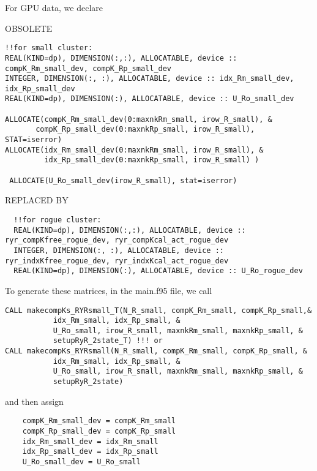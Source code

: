 For GPU data, we declare

OBSOLETE
\begin{verbatim}
!!for small cluster:
REAL(KIND=dp), DIMENSION(:,:), ALLOCATABLE, device :: compK_Rm_small_dev, compK_Rp_small_dev
INTEGER, DIMENSION(:, :), ALLOCATABLE, device :: idx_Rm_small_dev, idx_Rp_small_dev
REAL(KIND=dp), DIMENSION(:), ALLOCATABLE, device :: U_Ro_small_dev

ALLOCATE(compK_Rm_small_dev(0:maxnkRm_small, irow_R_small), &
       compK_Rp_small_dev(0:maxnkRp_small, irow_R_small), STAT=iserror)
ALLOCATE(idx_Rm_small_dev(0:maxnkRm_small, irow_R_small), &
         idx_Rp_small_dev(0:maxnkRp_small, irow_R_small) )
         
 ALLOCATE(U_Ro_small_dev(irow_R_small), stat=iserror)         
\end{verbatim}
REPLACED BY
\begin{verbatim}
  !!for rogue cluster:
  REAL(KIND=dp), DIMENSION(:,:), ALLOCATABLE, device :: ryr_compKfree_rogue_dev, ryr_compKcal_act_rogue_dev
  INTEGER, DIMENSION(:, :), ALLOCATABLE, device :: ryr_indxKfree_rogue_dev, ryr_indxKcal_act_rogue_dev
  REAL(KIND=dp), DIMENSION(:), ALLOCATABLE, device :: U_Ro_rogue_dev
\end{verbatim}


To generate these matrices, in the main.f95 file, we call
\begin{verbatim}
CALL makecompKs_RYRsmall_T(N_R_small, compK_Rm_small, compK_Rp_small,& 
           idx_Rm_small, idx_Rp_small, &
           U_Ro_small, irow_R_small, maxnkRm_small, maxnkRp_small, &
           setupRyR_2state_T) !!! or
CALL makecompKs_RYRsmall(N_R_small, compK_Rm_small, compK_Rp_small, &
           idx_Rm_small, idx_Rp_small, &
           U_Ro_small, irow_R_small, maxnkRm_small, maxnkRp_small, & 
           setupRyR_2state)
\end{verbatim}
and then assign
\begin{verbatim}
    compK_Rm_small_dev = compK_Rm_small
    compK_Rp_small_dev = compK_Rp_small
    idx_Rm_small_dev = idx_Rm_small
    idx_Rp_small_dev = idx_Rp_small
    U_Ro_small_dev = U_Ro_small
\end{verbatim}



